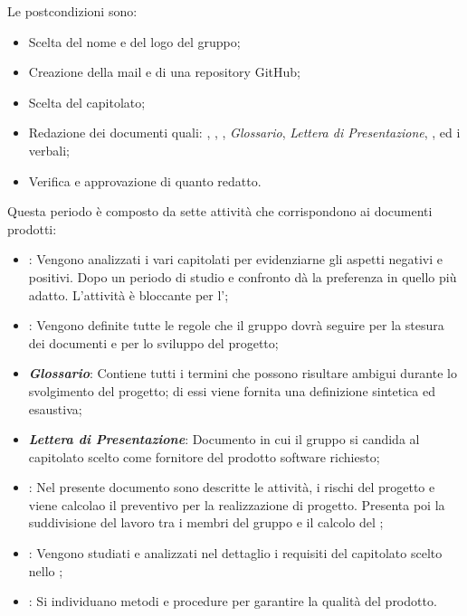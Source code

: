 Le postcondizioni sono:
\begin{itemize}
    \item Scelta del nome e del logo del gruppo;
    \item Creazione della mail e di una repository GitHub;
    \item Scelta del capitolato;
    \item Redazione dei documenti quali: \textit{\SdF}, \textit{\NdP}, \textit{\PdP}, \textit{Glossario}, \textit{Lettera di Presentazione}, \textit{\PdQ}, \textit{\AdR} ed i verbali;
    \item Verifica e approvazione di quanto redatto.
\end{itemize}
Questa periodo è composto da sette attività che corrispondono ai documenti prodotti:
\begin{itemize}
    \item \textbf{\textit{\SdF}}: Vengono analizzati i vari capitolati per evidenziarne gli aspetti
negativi e positivi. Dopo un periodo di studio e confronto {\Gruppo} dà la preferenza in quello più adatto. L'attività è bloccante per l'\textit{\AdR};

    \item \textbf{\textit{\NdP}}: Vengono definite tutte le regole che il gruppo {\Gruppo} dovrà seguire per la stesura dei documenti e per lo sviluppo del progetto;

    \item \textbf{\textit{Glossario}}: Contiene tutti i termini che possono risultare ambigui durante lo svolgimento del progetto; di essi viene fornita una definizione sintetica ed esaustiva;

    \item \textbf{\textit{Lettera di Presentazione}}: Documento in cui il gruppo {\Gruppo} si candida al capitolato scelto come fornitore del prodotto software richiesto;

    \item \textbf{\textit{\PdP}}: Nel presente documento sono descritte le attività, i rischi del progetto e viene calcolao il preventivo per la realizzazione di progetto. Presenta poi la suddivisione del lavoro tra i membri del gruppo {\Gruppo} e il calcolo del ;

    \item \textbf{\textit{\AdR}}: Vengono studiati e analizzati nel dettaglio i requisiti del capitolato scelto nello \textit{\SdF};

    \item \textbf{\textit{\PdQ}}: Si individuano metodi e procedure per garantire la qualità del prodotto.
\end{itemize}
